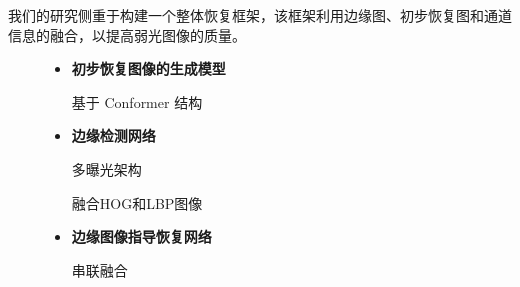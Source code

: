 \documentclass[CJK,aspectratio=169]{beamer}  %
\begin{document}
	\begin{frame}
		
		{ \yahei 我们的研究侧重于构建一个整体恢复框架，该框架利用边缘图、初步恢复图和通道信息的融合，以提高弱光图像的质量。}
		
		
		
		\begin{figure}
			\begin{minipage}{.4\columnwidth}
				\begin{itemize}
					\item \textbf{初步恢复图像的生成模型}
					
					{ 基于 Conformer 结构}
					
					
					
					\item \textbf{边缘检测网络}
					
					{ 多曝光架构}
					
					{ 融合HOG和LBP图像}
					
					
					\item \textbf{边缘图像指导恢复网络}
					
					{ 串联融合}
					

\end{itemize}
\end{minipage}
\end{figure}
\end{frame}
\end{document}
